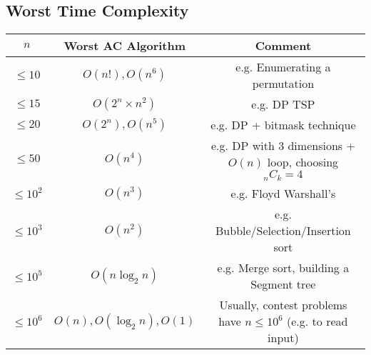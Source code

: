 \documentclass[9pt,a4paper,twocolumn,landscape,oneside]{amsart}
\begin{document}
    \subsection{Worst Time Complexity}
    \begin{center}
        \begin{tabular}{c|c|c}
            $n$ & Worst AC Algorithm & Comment \\
            \hline
            $\leq 10$ & $O(n!), O(n^6)$ & e.g. Enumerating a permutation \\
            $\leq 15$ & $O(2^n\times n^2)$ & e.g. DP TSP \\
            $\leq 20$ & $O(2^n), O(n^5)$ & e.g. DP + bitmask technique \\
            $\leq 50$ & $O(n^4)$ & e.g. DP with 3 dimensions + $O(n)$ loop, choosing  $_nC_k=4$ \\
            $\leq 10^2$ & $O(n^3)$ & e.g. Floyd Warshall's \\
            $\leq 10^3$ & $O(n^2)$ & e.g. Bubble/Selection/Insertion sort \\
            $\leq 10^5$ & $O(n\log_2{n})$ & e.g. Merge sort, building a Segment tree \\
            $\leq 10^6$ & $O(n), O(\log_2{n}), O(1)$ & Usually, contest problems have $n\leq10^6$ (e.g. to read input) \\
        \end{tabular}
    \end{center}
\end{document}
